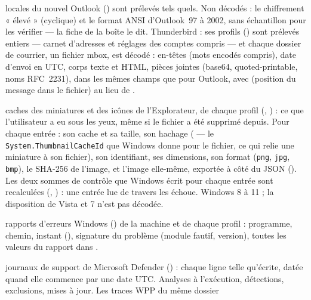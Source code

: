 \documentclass[11pt,a4paper,oneside]{report}
\begin{document}
\begin{description}[style=nextline,leftmargin=1.2em]
        locales du nouvel Outlook ()
        sont prélevés tels quels. Non décodés : le chiffrement « élevé »
        (cyclique) et le format ANSI d'Outlook~97 à 2002, sans échantillon pour
        les vérifier — la fiche de la boîte le dit. Thunderbird : ses profils
        ()
        sont prélevés entiers — carnet d'adresses et réglages des comptes
        compris — et chaque dossier de courrier, un fichier mbox, est décodé :
        en-têtes (mots encodés compris), date d'envoi en UTC, corps texte et
        HTML, pièces jointes (base64, quoted-printable, noms RFC~2231), dans
        les mêmes champs que pour Outlook, avec  (position du
        message dans le fichier) au lieu de .
  \item[\fichier{thumbcache.json}] caches des miniatures et des icônes de
        l'Explorateur, de chaque profil (,
        ) : ce que l'utilisateur a eu sous les yeux,
        même si le fichier a été supprimé depuis. Pour chaque entrée : son
        cache et sa taille, son hachage ( — le
        \texttt{System.ThumbnailCacheId} que Windows donne pour le fichier, ce
        qui relie une miniature à son fichier), son identifiant, ses
        dimensions, son format (\texttt{png}, \texttt{jpg}, \texttt{bmp}), le
        SHA-256 de l'image, et l'image elle-même, exportée à côté du JSON
        ().
        Les deux sommes de contrôle que Windows écrit pour chaque entrée sont
        recalculées (, ) :
        une entrée lue de travers les échoue. Windows 8 à 11 ; la disposition
        de Vista et 7 n'est pas décodée.
  \item[\fichier{error\_reports.json}] rapports d'erreurs Windows
        () de la machine et de chaque profil : programme,
        chemin, instant (), signature du problème
        (module fautif, version), toutes les valeurs du rapport dans
        .
  \item[\fichier{defender\_log.json}] journaux de support de Microsoft Defender
        () : chaque ligne telle qu'écrite, datée quand elle
        commence par une date UTC. Analyses à l'exécution, détections,
        exclusions, mises à jour. Les traces WPP du même dossier

\end{description}
\end{document}
